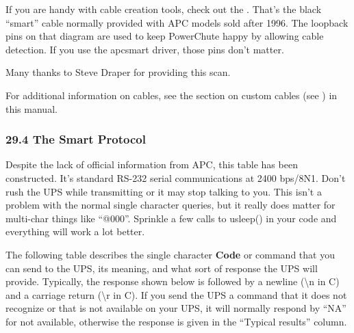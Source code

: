 If you are handy with cable creation tools, check out the 
. That's the black
``smart'' cable normally provided with APC models sold after 1996. The
loopback pins on that diagram are used to keep PowerChute happy by allowing
cable detection. If you use the 
 apcsmart driver, those pins don't
matter.  

Many thanks to Steve Draper for providing this scan.  

For additional information on cables, see the section on custom cables (see 
) in this manual. 

\label{The-Smart-Protocol}

\subsubsection*{29.4 The Smart Protocol}

Despite the lack of official information from APC, this table has been
constructed. It's standard RS-232 serial communications at 2400 bps/8N1. Don't
rush the UPS while transmitting or it may stop talking to you. This isn't a
problem with the normal single character queries, but it really does matter
for multi-char things like ``@000''. Sprinkle a few calls to usleep() in your
code and everything will work a lot better.  

The following table describes the single character {\bf Code} or command that
you can send to the UPS, its meaning, and what sort of response the UPS will
provide. Typically, the response shown below is followed by a newline
(\textbackslash{}n in C) and a carriage return (\textbackslash{}r in C). If
you send the UPS a command that it does not recognize or that is not available
on your UPS, it will normally respond by ``NA'' for not available, otherwise
the response is given in the ``Typical results'' column. \gt{}  

